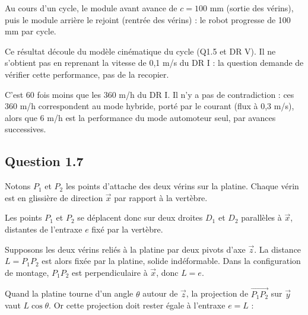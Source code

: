 \documentclass[11pt,a4paper]{article}
\newcommand{\equationajustee}[1]{%
  \sbox{\boiteequation}{$\displaystyle #1$}%
  \ifdim\wd\boiteequation>\linewidth
    \[\resizebox{\linewidth}{!}{\usebox{\boiteequation}}\]%
  \else
    \[#1\]%
  \fi}
\begin{document}
Au cours d'un cycle, le module avant avance de \(c = 100\) mm (sortie des vérins), puis le module arrière le rejoint (rentrée des vérins) : le robot progresse de 100 mm par cycle.

\equationajustee{\begin{aligned}
D &= \frac{3600}{60}\times 100\ \text{mm} \\
&= 6\,000\ \text{mm}
\end{aligned}}

\equationajustee{\boxed{D = 6\ \text{m en 1 h}}}

Ce résultat découle du modèle cinématique du cycle (Q1.5 et DR V). Il ne s'obtient pas en reprenant la vitesse de 0,1 m/s du DR I : la question demande de vérifier cette performance, pas de la recopier.

C'est 60 fois moins que les 360 m/h du DR I. Il n'y a pas de contradiction : ces 360 m/h correspondent au mode hybride, porté par le courant (flux à 0,3 m/s), alors que 6 m/h est la performance du mode automoteur seul, par avances successives.

\hypertarget{question-1.7}{%
\subsection{Question 1.7}\label{question-1.7}}

Notons \(P_1\) et \(P_2\) les points d'attache des deux vérins sur la platine. Chaque vérin est en glissière de direction \(\vec x\) par rapport à la vertèbre.

Les points \(P_1\) et \(P_2\) se déplacent donc sur deux droites \(D_1\) et \(D_2\) parallèles à \(\vec x\), distantes de l'entraxe \(e\) fixé par la vertèbre.

Supposons les deux vérins reliés à la platine par deux pivots d'axe \(\vec z\). La distance \(L = P_1P_2\) est alors fixée par la platine, solide indéformable. Dans la configuration de montage, \(P_1P_2\) est perpendiculaire à \(\vec x\), donc \(L = e\).

Quand la platine tourne d'un angle \(\theta\) autour de \(\vec z\), la projection de \(\overrightarrow{P_1P_2}\) sur \(\vec y\) vaut \(L\cos\theta\). Or cette projection doit rester égale à l'entraxe \(e = L\) :

\equationajustee{\begin{aligned}
L\cos\theta &= L \\
\Longrightarrow\quad \theta &= 0
\end{aligned}}
\end{document}
